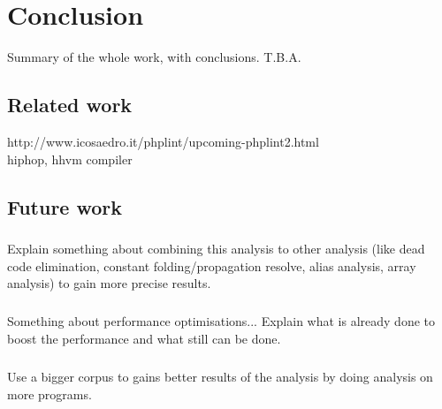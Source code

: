 \documentclass[main.tex]{subfiles}
\begin{document}
    \chapter{Conclusion}\label{chap:conclusion}
    Summary of the whole work, with conclusions. T.B.A.
    
    \section{Related work}
    http://www.icosaedro.it/phplint/upcoming-phplint2.html \\
    hiphop, hhvm compiler
    \section{Future work}
    
    \paragraph{}
    Explain something about combining this analysis to other analysis (like dead code elimination, constant folding/propagation resolve, alias analysis, array analysis) to gain more precise results.
    
    \paragraph{}
    Something about performance optimisations... Explain what is already done to boost the performance and what still can be done.
        
    \paragraph{}
    Use a bigger corpus to gains better results of the analysis by doing analysis on more programs.
    
\end{document}
